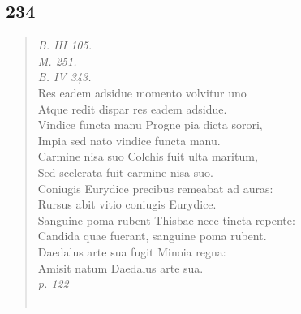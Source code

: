 \documentclass[11pt, a4paper]{report}
\begin{document}
            \subsection*{234}
      \begin{verse}
      \textit{B. III 105.} \\ \textit{M. 251.} \\ \textit{B. IV 343.} \\ Res eadem adsidue momento volvitur uno \\ Atque redit dispar res eadem adsidue. \\ Vindice functa manu Progne pia dicta sorori, \\ Impia sed nato vindice functa manu. \\ Carmine nisa suo Colchis fuit ulta maritum, \\ Sed scelerata fuit carmine nisa suo. \\ Coniugis Eurydice precibus remeabat ad auras: \\ Rursus abit vitio coniugis Eurydice. \\ Sanguine poma rubent Thisbae nece tincta repente: \\ Candida quae fuerant, sanguine poma rubent. \\ Daedalus arte sua fugit Minoia regna: \\ Amisit natum Daedalus arte sua. \\ \textit{p. 122} \\ 
        ﻿\pagebreak 

\end{verse}
\end{document}

